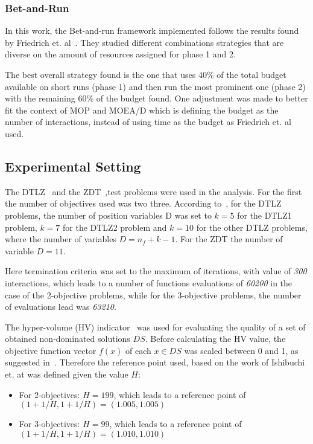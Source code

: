 \subsubsection{Bet-and-Run}

In this work, the Bet-and-run framework implemented follows the results found  by Friedrich et. al~\cite{friedrich2017generic}. They studied different combinations strategies that are diverse on the amount of resources assigned for phase 1 and 2. 

The best overall strategy found is the one that uses 40\% of the total budget available on short runs (phase 1) and then run the most prominent one (phase 2) with the remaining 60\% of the budget found. One adjustment was made to better fit the context of MOP and MOEA/D which is defining the budget as the number of interactions, instead of using time as the budget as Friedrich et. al used.



%

\subsection{Experimental Setting}


The DTLZ~\cite{deb2005scalable} and the ZDT~\cite{zitzler2000comparison},test problems were used in the analysis. For the first the number of objectives used was two three. According to~\cite{deb2005scalable}, for the DTLZ problems, the number of position variables D was set to $k = 5$ for the DTLZ1 problem, $k = 7$ for the DTLZ2 problem and $k = 10$ for the other DTLZ problems, where the number of variables $D = n_f + k -1$. For the ZDT the number of variable $D = 11$.

Here termination criteria was set to the maximum of iterations, with value of \textit{300} interactions, which leads to a number of functions evaluations of \textit{60200} in the case of the 2-objective problems, while for the 3-objective problems, the number of evaluations lead was \textit{63210}.

The hyper-volume (HV) indicator~\cite{zitzler1998multiobjective} was used for evaluating the quality of a set of obtained non-dominated solutions $DS$. Before calculating the HV value, the objective function vector $f(x)$ of each $x \in DS$ was scaled between 0 and 1, as suggested in~\cite{ishibuchi2018specify}. Therefore the reference point used, based on the work of Ishibuchi et. at was defined given the value $H$:
\begin{itemize}
	\item For 2-objectives: $H = 199$, which leads to a reference point of $(1+1/H, 1+1/H) = (1.005, 1.005)$
	\item For 3-objectives: $H = 99$, which leads to a reference point of $(1+1/H, 1+1/H) = (1.010, 1.010)$
\end{itemize}



